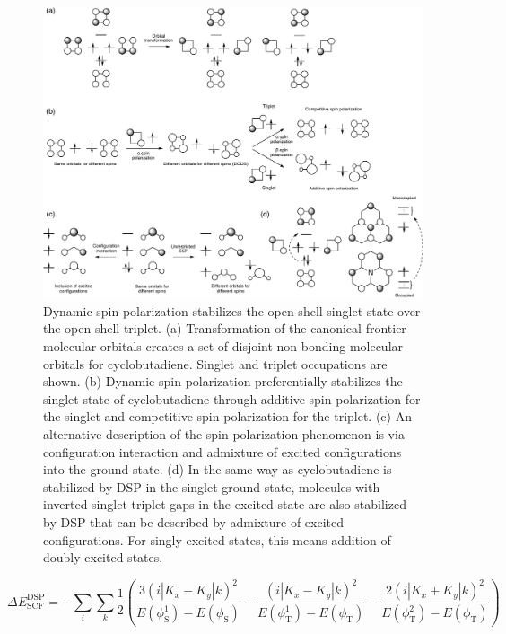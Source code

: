 \documentclass[
  number,
  3p]{elsarticle}
\newcommand{\DeltaE}[2][]{\Delta E^{\mathrm{#1}}_{\mathrm{#2}}}
\newcommand{\EState}[2][]{E (\phi_{\mathrm{#2}}^{#1})}
\newcommand{\Integral}[1]{(i | K_x #1 K_y | k )^2}
\begin{document}
\begin{figure}

{\centering \includegraphics{../data/figures/dynamic_spin_polarization.pdf}

}

\caption{\label{fig-dsp}Dynamic spin polarization stabilizes the
open-shell singlet state over the open-shell triplet. (a) Transformation
of the canonical frontier molecular orbitals creates a set of disjoint
non-bonding molecular orbitals for cyclobutadiene. Singlet and triplet
occupations are shown. (b) Dynamic spin polarization preferentially
stabilizes the singlet state of cyclobutadiene through additive spin
polarization for the singlet and competitive spin polarization for the
triplet. (c) An alternative description of the spin polarization
phenomenon is via configuration interaction and admixture of excited
configurations into the ground state. (d) In the same way as
cyclobutadiene is stabilized by DSP in the singlet ground state,
molecules with inverted singlet-triplet gaps in the excited state are
also stabilized by DSP that can be described by admixture of excited
configurations. For singly excited states, this means addition of doubly
excited states.}

\end{figure}

\[
\DeltaE[DSP]{SCF} =  - \sum_{i}\sum_{k}
    \frac{1}{2} \left( 
    \frac{3 \Integral{-}}{\EState[1]{S} - \EState{S}}
    - \frac{\Integral{-}}{\EState[1]{T} - \EState{T}}
    - \frac{2 \Integral{+}}{\EState[2]{T} - \EState{T}}
    \right)
\]
\end{document}
